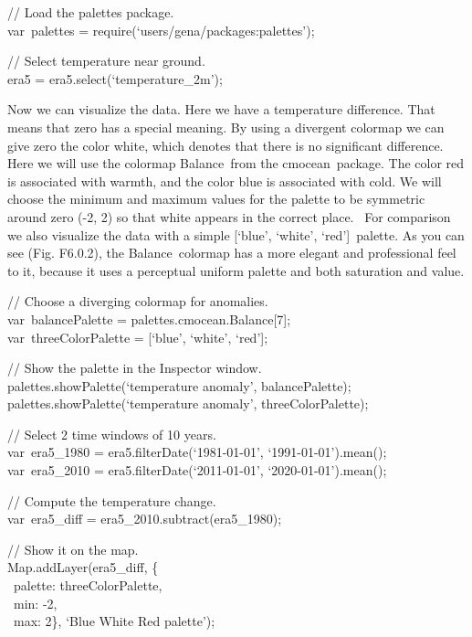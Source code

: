 \documentclass[
  letterpaper,
  DIV=11,
  numbers=noendperiod]{scrreprt}
\begin{document}
// Load the palettes package.\\
var~palettes = require(`users/gena/packages:palettes');

// Select temperature near ground.\\
era5 = era5.select(`temperature\_2m');

Now we can visualize the data. Here we have a temperature difference.
That means that zero has a special meaning. By using a divergent
colormap we can give zero the color white, which denotes that there is
no significant difference. Here we will use the colormap Balance~from
the cmocean~package. The color red is associated with warmth, and the
color blue is associated with cold. We will choose the minimum and
maximum values for the palette to be symmetric around zero (-2, 2) so
that white appears in the correct place. ~For comparison we also
visualize the data with a simple {[}`blue', `white', `red'{]}~palette.
As you can see (Fig. F6.0.2), the Balance~colormap has a more elegant
and professional feel to it, because it uses a perceptual uniform
palette and both saturation and value.

// Choose a diverging colormap for anomalies.\\
var~balancePalette = palettes.cmocean.Balance{[}7{]};\\
var~threeColorPalette = {[}`blue', `white', `red'{]};

// Show the palette in the Inspector window.\\
palettes.showPalette(`temperature anomaly', balancePalette);\\
palettes.showPalette(`temperature anomaly', threeColorPalette);

// Select 2 time windows of 10 years.\\
var~era5\_1980 = era5.filterDate(`1981-01-01', `1991-01-01').mean();\\
var~era5\_2010 = era5.filterDate(`2011-01-01', `2020-01-01').mean();

// Compute the temperature change.\\
var~era5\_diff = era5\_2010.subtract(era5\_1980);

// Show it on the map.\\
Map.addLayer(era5\_diff, \{\\
\hspace*{0.333em} ~palette: threeColorPalette,\\
\hspace*{0.333em} ~min: -2,\\
\hspace*{0.333em} ~max: 2\}, `Blue White Red palette');
\end{document}

